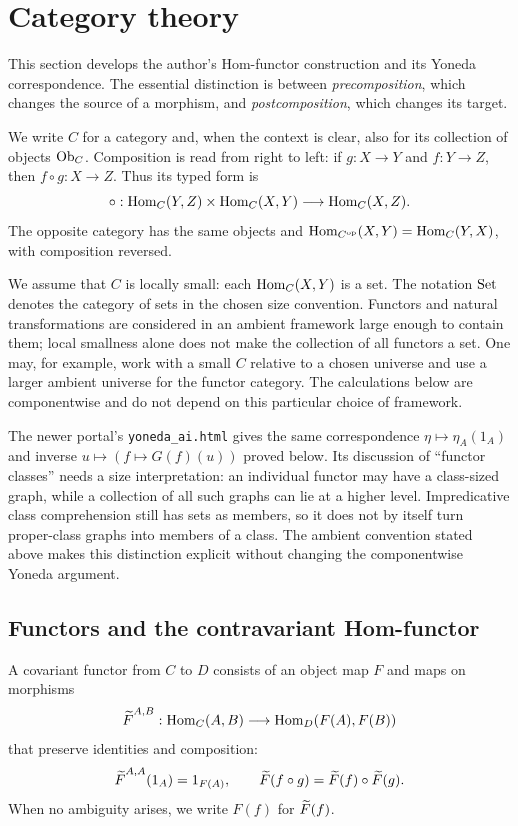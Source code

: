 \def\topic{Category theory and the Yoneda lemma}

\section{Category theory}

This section develops the author's Hom-functor construction and its
Yoneda correspondence. The essential distinction is between
\emph{precomposition}, which changes the source of a morphism, and
\emph{postcomposition}, which changes its target.

We write $C$ for a category and, when the context is clear, also for its
collection of objects ${\textrm{Ob}}_C$. Composition is read from right to left:
if $g:X\to Y$ and $f:Y\to Z$, then $f\circ g:X\to Z$. Thus its typed form is
\[
\circ:{\textrm{Hom}}_C(Y,Z)\times{\textrm{Hom}}_C(X,Y)\longrightarrow{\textrm{Hom}}_C(X,Z).
\]
The opposite category has the same objects and
${\textrm{Hom}}_{C^{\textrm{op}}}(X,Y)={\textrm{Hom}}_C(Y,X)$, with composition reversed.

We assume that $C$ is locally small: each ${\textrm{Hom}}_C(X,Y)$ is a set.
The notation ${\textrm{Set}}$ denotes the category of sets in the chosen size
convention. Functors and natural transformations are considered in an
ambient framework large enough to contain them; local smallness alone
does not make the collection of all functors a set. One may, for example,
work with a small $C$ relative to a chosen universe and use a larger
ambient universe for the functor category. The calculations below are
componentwise and do not depend on this particular choice of framework.

\begin{note}
The newer portal's \texttt{yoneda\_ai.html} gives the same correspondence
$\eta\mapsto\eta_A(1_A)$ and inverse $u\mapsto(f\mapsto G(f)(u))$
proved below. Its discussion of ``functor classes'' needs a size
interpretation: an individual functor may have a class-sized graph,
while a collection of all such graphs can lie at a higher level.
Impredicative class comprehension still has sets as members, so it does
not by itself turn proper-class graphs into members of a class.
The ambient convention stated above makes this distinction explicit
without changing the componentwise Yoneda argument.
\end{note}

\subsection{Functors and the contravariant Hom-functor}
\begin{definition}[Functor]
A covariant functor from $C$ to $D$ consists of an object map $F$ and
maps on morphisms
\[
{\widetilde{F}\textrm{}}^{A,B}:{\textrm{Hom}}_C(A,B)\longrightarrow{\textrm{Hom}}_D(F(A),F(B))
\]
that preserve identities and composition:
\[
{\widetilde{F}\textrm{}}^{A,A}(1_A)=1_{F(A)},\qquad
{\widetilde{F}\textrm{}}(f\circ g)={\widetilde{F}\textrm{}}(f)\circ{\widetilde{F}\textrm{}}(g).
\]
When no ambiguity arises, we write $F(f)$ for ${\widetilde{F}\textrm{}}(f)$.
\end{definition}

